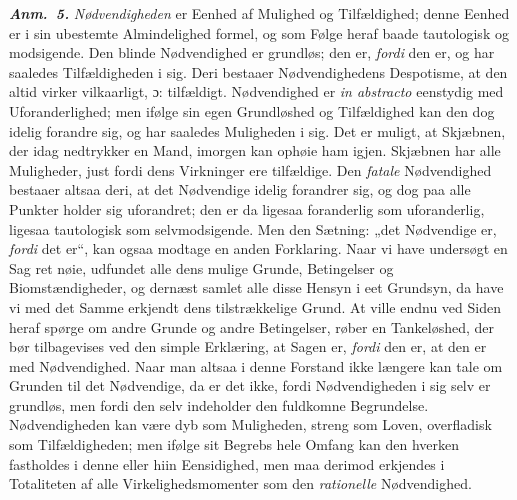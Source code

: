 \documentclass[12pt]{book}
\newcommand{\anm}[1]{\emph{\textbf{Anm.~#1.}}}
\newcommand{\dsi}{\textup{ɔ:}}
\newcommand{\opage}[1]{\marginnote{\footnotesize\textit{[#1]}}}
\begin{document}
\anm{5} \emph{Nødvendigheden} er Eenhed af Mulighed og Tilfældighed; denne Eenhed er i
sin ubestemte Almindelighed formel, og som Følge heraf baade tautologisk og modsigende.
Den blinde Nødvendighed er grundløs; den er, \emph{fordi} den er, og har saaledes
Tilfældigheden i sig. Deri bestaaer Nødvendighedens Despotisme, at den altid virker
vilkaarligt, \dsi{} tilfældigt. Nødvendighed er \textit{in abstracto} eenstydig med
Uforanderlighed; men ifølge sin egen Grundløshed og Tilfældighed kan den dog idelig
forandre sig, og har saaledes Muligheden i sig. Det er muligt, at Skjæbnen, der idag
nedtrykker en Mand, imorgen kan ophøie ham igjen. Skjæbnen har alle Muligheder, just
fordi dens Virkninger ere tilfældige. Den \emph{fatale} Nødvendighed bestaaer altsaa
deri, at det Nødvendige idelig forandrer sig, og dog paa alle Punkter holder sig
uforandret; den er da ligesaa foranderlig som uforanderlig, ligesaa tautologisk som
selvmodsigende. Men den Sætning: „det Nødvendige er, \emph{fordi} det er“,
\opage{158} kan ogsaa modtage en anden Forklaring. Naar vi have undersøgt en Sag ret nøie, udfundet
alle dens mulige Grunde, Betingelser og Biomstændigheder, og dernæst samlet alle disse
Hensyn i eet Grundsyn, da have vi med det Samme erkjendt dens tilstrækkelige Grund. At
ville endnu ved Siden heraf spørge om andre Grunde og andre Betingelser, røber en
Tankeløshed, der bør tilbagevises ved den simple Erklæring, at Sagen er, \emph{fordi}
den er, at den er med Nødvendighed. Naar man altsaa i denne Forstand ikke længere kan
tale om Grunden til det Nødvendige, da er det ikke, fordi Nødvendigheden i sig selv er
grundløs, men fordi den selv indeholder den fuldkomne Begrundelse. Nødvendigheden kan
være dyb som Muligheden, streng som Loven, overfladisk som Tilfældigheden; men ifølge
sit Begrebs hele Omfang kan den hverken fastholdes i denne eller hiin Eensidighed, men
maa derimod erkjendes i Totaliteten af alle Virkelighedsmomenter som den
\emph{rationelle} Nødvendighed.
\end{document}

